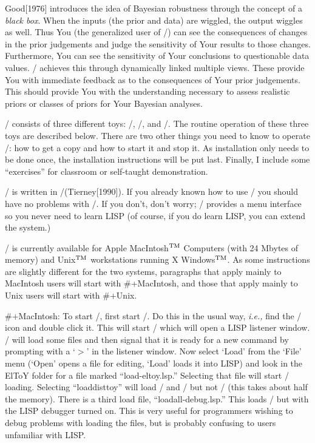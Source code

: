 Good[1976] introduces the idea of Bayesian robustness through the concept
of a {\it black box}.  When the inputs
(the prior and data) are wiggled, the output wiggles as well.  Thus
You (the generalized user of \eltoy/) can see the consequences of
changes in the prior judgements and judge the sensitivity of Your
results to those changes.  Furthermore, You can see the sensitivity of
Your conclusions to questionable data values.  \eltoy/ achieves this
through dynamically linked multiple views.  These provide You with
immediate feedback as to the consequences of Your prior judgements.
This should provide You with the understanding necessary to assess
realistic priors or classes of priors for Your Bayesian analyses.


\eltoy/ consists of three different toys:  \disttoy/, \clttoy/, and
\eltoy/.  The routine operation of these three toys are described
below.  There are two other things you need to know to operate
\eltoy/: how to get a copy and how to start it and stop it.  As
installation only needs to be done once, the installation instructions
will be put last.  Finally, I include some ``exercises'' for classroom
or self-taught demonstration.

\eltoy/ is written in \xlispstat/(Tierney[1990]).  If you already known
how to use \xlispstat/ you should have no problems with \eltoy/.  If
you don't, don't worry; \eltoy/ provides a menu interface so you never
need to learn LISP (of course, if you do learn LISP, you can extend
the system.)

\xlispstat/ is currently available for Apple MacIntosh${}^{\rm TM}$
Computers (with 24 Mbytes of memory) and Unix${}^{\rm TM}$
workstations running X Windows${}^{\rm TM}$.  As some instructions are
slightly different for the two systems, paragraphs that apply mainly
to MacIntosh users will start with \#+MacIntosh, and those that apply
mainly to Unix users will start with \#+Unix.


\#+MacIntosh:  To start \eltoy/, first start \xlispstat/.  Do this in
the usual way, {\it i.e.,} find the \xlispstat/ icon and double click
it.  This will start \xlispstat/ which will open a LISP listener
window.  \xlispstat/ will load some files and then signal that it is
ready for a new command by prompting with a `$>$' in the listener
window.  Now select `Load' from the `File' menu
(`Open' opens a file for editing, `Load' loads it into LISP)
and look in the ElToY folder for a file marked ``load-eltoy.lsp.''
Selecting that file will start \eltoy/ loading.  Selecting
``loaddisttoy'' will load \disttoy/ and \clttoy/ but not \eltoy/
(this takes about half the memory).
There is a third load file, ``loadall-debug.lsp.''  This loads \eltoy/
but with the LISP debugger turned on.  This is very useful for
programmers wishing to debug problems with loading the files, but is
probably confusing to users unfamiliar with LISP.

